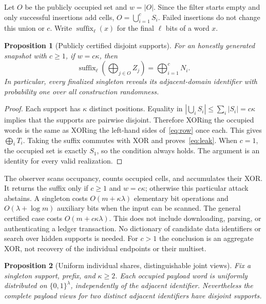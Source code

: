 \documentclass[11pt]{article}
\newtheorem{proposition}{Proposition}
\newcommand{\suffix}{\operatorname{suffix}}
\begin{document}
Let $O$ be the publicly occupied set and $w=|O|$. Since the filter starts empty
and only successful insertions add cells,
$O=\bigcup_{i=1}^{c}S_i$. Failed insertions do not change this union or $c$.
Write $\suffix_\ell(x)$ for the final $\ell$ bits of a word $x$.

\begin{proposition}[Publicly certified disjoint supports]
\label{prop:disjoint}
For an honestly generated snapshot with $c\geq1$, if $w=c\kappa$, then
\begin{equation}
 \suffix_\ell\!\left(\bigoplus_{j\in O}Z_j\right)
       =\bigoplus_{i=1}^{c}N_i.
 \label{eq:leak}
\end{equation}
In particular, every finalized singleton reveals its adjacent-domain
identifier with probability one over all construction randomness.
\end{proposition}

\begin{proof}
Each support has $\kappa$ distinct positions. Equality in
$|\bigcup_i S_i|\leq\sum_i|S_i|=c\kappa$ implies that the supports are pairwise
disjoint. Therefore XORing the occupied words is the same as XORing the
left-hand sides of~\eqref{eq:row} once each. This gives $\bigoplus_i T_i$.
Taking the suffix commutes with XOR and proves~\eqref{eq:leak}.
When $c=1$, the occupied set is exactly $S_1$, so the condition always holds.
The argument is an identity for every valid realization.
\end{proof}

The observer scans occupancy, counts occupied cells, and accumulates their
XOR. It returns the suffix only if $c\geq1$ and $w=c\kappa$; otherwise this
particular attack abstains. A singleton costs $O(m+\kappa\lambda)$ elementary
bit operations and $O(\lambda+\log m)$ auxiliary bits when the input can be
scanned. The general certified case costs $O(m+c\kappa\lambda)$. This does not
include downloading, parsing, or authenticating a ledger transaction. No
dictionary of candidate data identifiers or search over hidden supports is
needed. For $c>1$ the conclusion is an aggregate XOR, not recovery of the
individual endpoints or their multiset.

\begin{proposition}[Uniform individual shares, distinguishable joint views]
\label{prop:joint}
Fix a singleton support, prefix, and $\kappa\geq2$. Each occupied payload word
is uniformly distributed on $\{0,1\}^{\lambda}$, independently of the adjacent
identifier. Nevertheless the complete payload views for two distinct adjacent
identifiers have disjoint supports.
\end{proposition}
\end{document}
